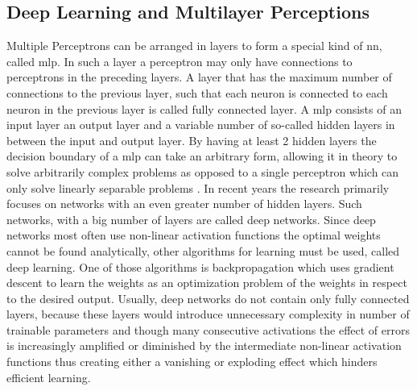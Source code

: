 \subsection{Deep Learning and Multilayer Perceptions}
Multiple Perceptrons can be arranged in layers to form a special kind of \ac{nn}, called \ac{mlp}. In such a layer a perceptron may only have connections to perceptrons in the preceding layers. A layer that has the maximum number of connections to the previous layer, such that each neuron is connected to each neuron in the previous layer is called fully connected layer. A \ac{mlp} consists of an input layer an output layer and a variable number of so-called hidden layers in between the input and output layer. By having at least 2 hidden layers the decision boundary of a \ac{mlp} can take an arbitrary form, allowing it in theory to solve arbitrarily complex problems as opposed to a single perceptron which can only solve linearly separable problems \cite{Lapedes1988}. In recent years the research primarily focuses on networks with an even greater number of hidden layers. Such networks, with a big number of layers are called deep networks. Since deep networks most often use non-linear activation functions the optimal weights cannot be found analytically, other algorithms for learning must be used, called deep learning. One of those algorithms is backpropagation which uses gradient descent to learn the weights as an optimization problem of the weights in respect to the desired output. Usually, deep networks do not contain only fully connected layers, because these layers would introduce unnecessary complexity in number of trainable parameters and though many consecutive activations the effect of errors is increasingly amplified or diminished by the intermediate non-linear activation functions thus creating either a vanishing or exploding effect which hinders efficient learning\cite{Hanin2018}.

